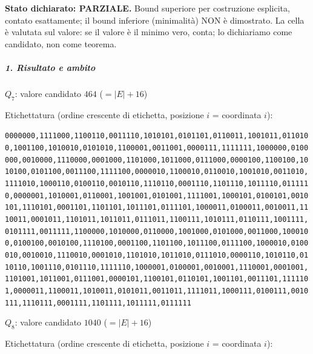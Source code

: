 \documentclass[11pt,a4paper]{article}
\begin{document}
\textbf{Stato dichiarato: PARZIALE.} Bound superiore per costruzione
esplicita, contato esattamente; il bound inferiore (minimalità) NON è
dimostrato. La cella è valutata sul valore: se il valore è il minimo
vero, conta; lo dichiariamo come candidato, non come teorema.

\subparagraph{1. Risultato e ambito}\label{risultato-e-ambito}

\(Q_7\): valore candidato \(464\) (\(=|E|+16\))

Etichettatura (ordine crescente di etichetta, posizione \(i\) =
coordinata \(i\)):

\texttt{0000000,1111000,1100110,0011110,1010101,0101101,0110011,1001011,0110100,1001100,1010010,0101010,1100001,0011001,0000111,1111111,1000000,0100000,0010000,1110000,0001000,1101000,1011000,0111000,0000100,1100100,1010100,0101100,0011100,1111100,0000010,1100010,0110010,1001010,0011010,1111010,1000110,0100110,0010110,1110110,0001110,1101110,1011110,0111110,0000001,1010001,0110001,1001001,0101001,1111001,1000101,0100101,0010101,1110101,0001101,1101101,1011101,0111101,1000011,0100011,0010011,1110011,0001011,1101011,1011011,0111011,1100111,1010111,0110111,1001111,0101111,0011111,1100000,1010000,0110000,1001000,0101000,0011000,1000100,0100100,0010100,1110100,0001100,1101100,1011100,0111100,1000010,0100010,0010010,1110010,0001010,1101010,1011010,0111010,0000110,1010110,0110110,1001110,0101110,1111110,1000001,0100001,0010001,1110001,0001001,1101001,1011001,0111001,0000101,1100101,0110101,1001101,0011101,1111101,0000011,1100011,1010011,0101011,0011011,1111011,1000111,0100111,0010111,1110111,0001111,1101111,1011111,0111111}

\(Q_8\): valore candidato \(1040\) (\(=|E|+16\))

Etichettatura (ordine crescente di etichetta, posizione \(i\) =
coordinata \(i\)):
\end{document}
